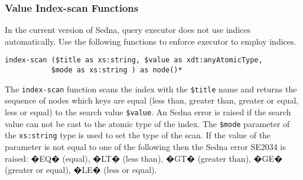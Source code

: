 \documentclass[a4paper,12pt]{article}
\begin{document}

\subsubsection{Value Index-scan Functions}
\label{sec:value-index-scan-fun}
In the current version of Sedna, query executor does not use indices automatically. Use the following functions
to enforce executor to employ indices.

\begin{verbatim}
index-scan ($title as xs:string, $value as xdt:anyAtomicType,
           $mode as xs:string ) as node()*
\end{verbatim}

The \verb!index-scan! function scans the index with the \verb!$title! name and returns the sequence of nodes which keys are equal (less than, greater than, greater or equal, less or equal) to the search value \verb!$value!. An Sedna error is raised if the search value can not be cast to the atomic type of the index. The \verb!$mode! parameter of the \verb!xs:string! type is used to set the type of the scan. If the value of the parameter is not equal to one of the following then the Sedna error SE2034 is raised: �EQ� (equal), �LT� (less than), �GT� (greater than), �GE� (greater or equal), �LE� (less or equal).
\end{document}
